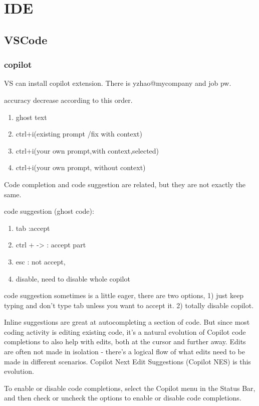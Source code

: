 \documentclass[paper=8.5in:11in, twoside, 12pt, pagesize=pdftex]{book}
\begin{document}
\section{IDE}
\subsection{VSCode}
\subsubsection{copilot}
VS can install copilot extension. There is yzhao@mycompany and job pw. 

accuracy decrease according to this order. 
\begin{enumerate}
	\item ghost text
	
	\item  ctrl+i(existing prompt /fix with context) 
	
	\item  ctrl+i(your own prompt,with context,selected)
	
	\item ctrl+i(your own prompt, without context) 
\end{enumerate} 

Code completion and code suggestion are related, but they are not exactly the same. 

code suggestion (ghost code):
\begin{enumerate}
	\item tab :accept
	\item ctrl + -> : accept part
	\item esc : not accept, 
	\item disable, need to disable whole copilot
\end{enumerate}

code suggestion sometimes is a little eager, there are two options, 1) just keep typing and don't type tab unless you want to accept it. 2) totally disable copilot. 

Inline suggestions are great at autocompleting a section of code. But since most coding activity is editing existing code, it's a natural evolution of Copilot code completions to also help with edits, both at the cursor and further away. Edits are often not made in isolation - there's a logical flow of what edits need to be made in different scenarios. Copilot Next Edit Suggestions (Copilot NES) is this evolution.

To enable or disable code completions, select the Copilot menu in the Status Bar, and then check or uncheck the options to enable or disable code completions.
\end{document}
